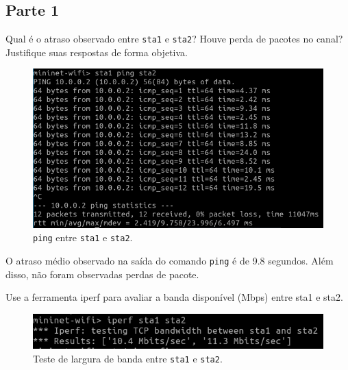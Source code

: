 \documentclass{article}
\begin{document}
\subsection*{Parte 1}

\begin{tcolorbox}
    Qual é o atraso observado entre \texttt{sta1} e \texttt{sta2}?
    Houve perda de pacotes no canal? Justifique suas respostas de forma objetiva.
\end{tcolorbox}

\begin{figure}[!htb]
\centering
\includegraphics[width=\columnwidth]{images/p1_ping.png}
\caption{\texttt{ping} entre \texttt{sta1} e \texttt{sta2}.}
\end{figure}

O atraso médio observado na saída do comando \texttt{ping} é de 9.8 segundos.
Além disso, não foram observadas perdas de pacote.

\begin{tcolorbox}
    Use a ferramenta iperf para avaliar a banda disponível (Mbps)
    entre sta1 e sta2.
\end{tcolorbox}

\begin{figure}[!htb]
\centering
\includegraphics[width=\columnwidth]{images/p1_iperf.png}
\caption{Teste de largura de banda entre \texttt{sta1} e \texttt{sta2}.}
\end{figure}
\end{document}
